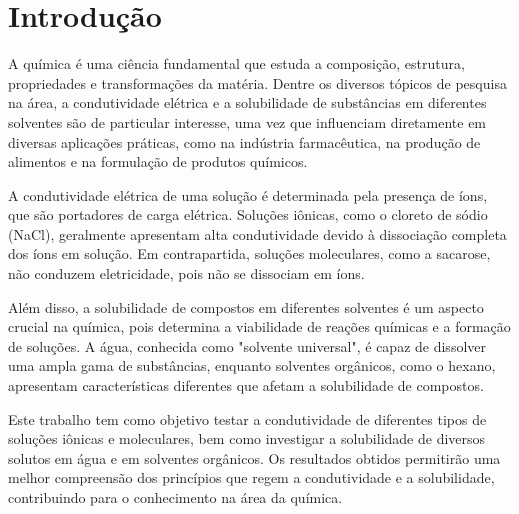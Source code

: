 \chapter{Introdução}

A química é uma ciência fundamental que estuda a composição, estrutura, propriedades e transformações da matéria. Dentre os diversos tópicos de pesquisa na área, a condutividade elétrica e a solubilidade de substâncias em diferentes solventes são de particular interesse, uma vez que influenciam diretamente em diversas aplicações práticas, como na indústria farmacêutica, na produção de alimentos e na formulação de produtos químicos.

A condutividade elétrica de uma solução é determinada pela presença de íons, que são portadores de carga elétrica. Soluções iônicas, como o cloreto de sódio (NaCl), geralmente apresentam alta condutividade devido à dissociação completa dos íons em solução. Em contrapartida, soluções moleculares, como a sacarose, não conduzem eletricidade, pois não se dissociam em íons.

Além disso, a solubilidade de compostos em diferentes solventes é um aspecto crucial na química, pois determina a viabilidade de reações químicas e a formação de soluções. A água, conhecida como "solvente universal", é capaz de dissolver uma ampla gama de substâncias, enquanto solventes orgânicos, como o hexano, apresentam características diferentes que afetam a solubilidade de compostos.

Este trabalho tem como objetivo testar a condutividade de diferentes tipos de soluções iônicas e moleculares, bem como investigar a solubilidade de diversos solutos em água e em solventes orgânicos. Os resultados obtidos permitirão uma melhor compreensão dos princípios que regem a condutividade e a solubilidade, contribuindo para o conhecimento na área da química.
